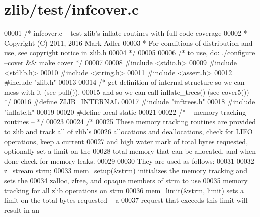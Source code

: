 \hypertarget{zlib_2test_2infcover_8c_source}{}\section{zlib/test/infcover.c}
\label{zlib_2test_2infcover_8c_source}

\begin{DoxyCode}
00001 \textcolor{comment}{/* infcover.c -- test zlib's inflate routines with full code coverage}
00002 \textcolor{comment}{ * Copyright (C) 2011, 2016 Mark Adler}
00003 \textcolor{comment}{ * For conditions of distribution and use, see copyright notice in zlib.h}
00004 \textcolor{comment}{ */}
00005 
00006 \textcolor{comment}{/* to use, do: ./configure --cover && make cover */}
00007 
00008 \textcolor{preprocessor}{#include <stdio.h>}
00009 \textcolor{preprocessor}{#include <stdlib.h>}
00010 \textcolor{preprocessor}{#include <string.h>}
00011 \textcolor{preprocessor}{#include <assert.h>}
00012 \textcolor{preprocessor}{#include "zlib.h"}
00013 
00014 \textcolor{comment}{/* get definition of internal structure so we can mess with it (see pull()),}
00015 \textcolor{comment}{   and so we can call inflate\_trees() (see cover5()) */}
00016 \textcolor{preprocessor}{#define ZLIB\_INTERNAL}
00017 \textcolor{preprocessor}{#include "inftrees.h"}
00018 \textcolor{preprocessor}{#include "inflate.h"}
00019 
00020 \textcolor{preprocessor}{#define local static}
00021 
00022 \textcolor{comment}{/* -- memory tracking routines -- */}
00023 
00024 \textcolor{comment}{/*}
00025 \textcolor{comment}{   These memory tracking routines are provided to zlib and track all of zlib's}
00026 \textcolor{comment}{   allocations and deallocations, check for LIFO operations, keep a current}
00027 \textcolor{comment}{   and high water mark of total bytes requested, optionally set a limit on the}
00028 \textcolor{comment}{   total memory that can be allocated, and when done check for memory leaks.}
00029 \textcolor{comment}{}
00030 \textcolor{comment}{   They are used as follows:}
00031 \textcolor{comment}{}
00032 \textcolor{comment}{   z\_stream strm;}
00033 \textcolor{comment}{   mem\_setup(&strm)         initializes the memory tracking and sets the}
00034 \textcolor{comment}{                            zalloc, zfree, and opaque members of strm to use}
00035 \textcolor{comment}{                            memory tracking for all zlib operations on strm}
00036 \textcolor{comment}{   mem\_limit(&strm, limit)  sets a limit on the total bytes requested -- a}
00037 \textcolor{comment}{                            request that exceeds this limit will result in an}

\end{DoxyCode}
